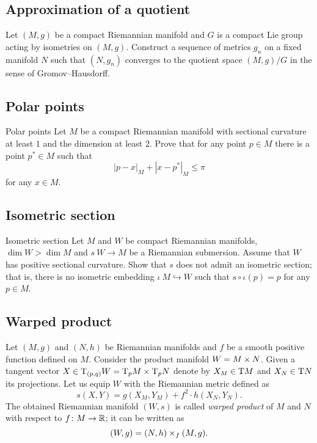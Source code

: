 \subsection*{Approximation of a quotient}

\begin{pr}{}{}
Let $(M,g)$ be a compact Riemannian manifold 
and $G$ is a compact Lie group acting by isometries on $(M,g)$.
Construct a sequence of metrics $g_n$ on a fixed manifold $N$ such that $(N,g_n)$ converges to the quotient space $(M,g)/G$ in the sense of Gromov--Hausdorff.
\end{pr}


\subsection*{Polar points\many}

\begin{pr}{\many}{Polar points}\label{milka-polar} 
Let $M$ be a compact Riemannian manifold with sectional curvature at least $1$ 
and the dimension at least $2$. 
Prove that for any point $p\in M$ there is a point $p^*\in M$ such that 
\[|p-x|_M+|x-p^*|_M\le \pi\]
for any $x\in M$.
\end{pr}

\subsection*{Isometric section\hard}

\begin{pr}{\hard}{Isometric section}\label{Isometric section}
Let $M$ and $W$ be compact Riemannian manifolds,
$\dim W>\dim M$
and $s\:W\to M$ be a Riemannian submersion.
Assume that $W$ has positive sectional curvature.
Show that $s$ does not admit an isometric section;
that is, there is no isometric embedding $\iota\:M\hookrightarrow W$ such that $s\circ\iota(p)=p$ for any $p\in M$.
\end{pr}

\subsection*{Warped product}

\label{page:warped product}
Let $(M,g)$ and $(N,h)$ be Riemannian manifolds 
and $f$ be a smooth positive function defined on $M$.
Consider the product manifold $W\z=M\times N$.
Given a tangent vector 
$X\z\in \T_{(p,q)} W
\z=\T_p M\times \T_p N$ denote by 
$X_M\z\in \T M$ and $X_N\z\in \T N$ its projections.
Let us equip $W$ with the Riemannian metric defined as
\[s(X,Y)=g(X_M,Y_M)+f^2\cdot h(X_N,Y_N).\]
The obtained Riemannian manifold $(W,s)$ is called \emph{warped product} of $M$ and $N$ with respect to $f\colon M\to \mathbb{R}$;
it can be written as  
\[(W,g)\z=(N,h)\times_f(M,g).\]

